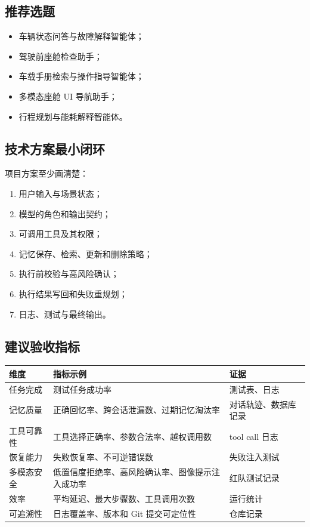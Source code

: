 \documentclass[UTF8,zihao=-4]{ctexart}
\begin{document}
\subsection{推荐选题}

\begin{itemize}
  \item 车辆状态问答与故障解释智能体；
  \item 驾驶前座舱检查助手；
  \item 车载手册检索与操作指导智能体；
  \item 多模态座舱 UI 导航助手；
  \item 行程规划与能耗解释智能体。
\end{itemize}

\subsection{技术方案最小闭环}

项目方案至少画清楚：

\begin{enumerate}
  \item 用户输入与场景状态；
  \item 模型的角色和输出契约；
  \item 可调用工具及其权限；
  \item 记忆保存、检索、更新和删除策略；
  \item 执行前校验与高风险确认；
  \item 执行结果写回和失败重规划；
  \item 日志、测试与最终输出。
\end{enumerate}

\subsection{建议验收指标}

\begin{table}[htbp]
\centering
\begin{tabularx}{\textwidth}{L{3.4cm} Y L{3.1cm}}
\toprule
维度 & 指标示例 & 证据\\
\midrule
任务完成 & 测试任务成功率 & 测试表、日志\\
记忆质量 & 正确回忆率、跨会话泄漏数、过期记忆淘汰率 & 对话轨迹、数据库记录\\
工具可靠性 & 工具选择正确率、参数合法率、越权调用数 & tool call 日志\\
恢复能力 & 失败恢复率、不可逆错误数 & 失败注入测试\\
多模态安全 & 低置信度拒绝率、高风险确认率、图像提示注入成功率 & 红队测试记录\\
效率 & 平均延迟、最大步骤数、工具调用次数 & 运行统计\\
可追溯性 & 日志覆盖率、版本和 Git 提交可定位性 & 仓库记录\\
\bottomrule
\end{tabularx}
\end{table}
\end{document}
